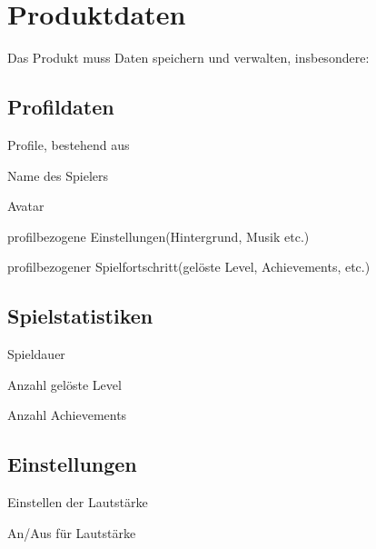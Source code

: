 \documentclass{scrartcl}
\begin{document}
\clearpage









\section{Produktdaten}
Das Produkt muss Daten speichern und verwalten, insbesondere: 

\subsection{Profildaten}

\begin{pdlist}
    \item \label{produktdaten:profile} Profile, bestehend aus 
    \begin{pdlist}
        \item \label{produktdaten:profile:name}Name des Spielers
        \item \label{produktdaten:profile:avatar}Avatar
        \item \label{produktdaten:profile:einstellungen}profilbezogene Einstellungen(Hintergrund, Musik etc.) 
        \item \label{produktdaten:profile:spielfortschritt}profilbezogener Spielfortschritt(gelöste Level, Achievements, etc.)
    \end{pdlist}
\end{pdlist}

\subsection{Spielstatistiken}
\label{produktdaten:spielestatistiken}

\begin{pdlist}[resume]
    \item Spieldauer
    \item Anzahl gelöste Level
    \item Anzahl Achievements
\end{pdlist}

\subsection{Einstellungen}
\label{produktdaten:einstellungen}

\begin{pdlist}[resume]
	\item Einstellen der Lautstärke
	\item An/Aus für Lautstärke
\end{pdlist}
\end{document}

